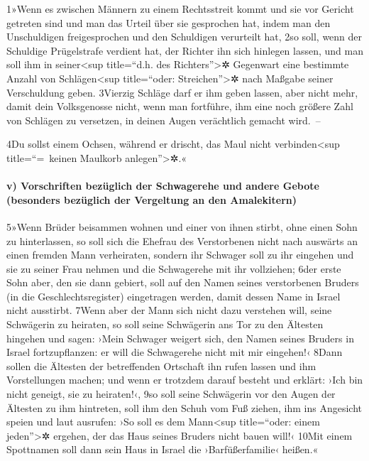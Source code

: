 1»Wenn es zwischen Männern zu einem Rechtsstreit kommt und sie vor
Gericht getreten sind und man das Urteil über sie gesprochen hat, indem
man den Unschuldigen freigesprochen und den Schuldigen verurteilt hat,
2so soll, wenn der Schuldige Prügelstrafe verdient hat, der Richter ihn
sich hinlegen lassen, und man soll ihm in seiner\textless sup
title=``d.h. des Richters''\textgreater✲ Gegenwart eine bestimmte Anzahl
von Schlägen\textless sup title=``oder: Streichen''\textgreater✲ nach
Maßgabe seiner Verschuldung geben. 3Vierzig Schläge darf er ihm geben
lassen, aber nicht mehr, damit dein Volksgenosse nicht, wenn man
fortführe, ihm eine noch größere Zahl von Schlägen zu versetzen, in
deinen Augen verächtlich gemacht wird.~--

4Du sollst einem Ochsen, während er drischt, das Maul nicht
verbinden\textless sup title=``=~keinen Maulkorb
anlegen''\textgreater✲.«

\hypertarget{v-vorschriften-bezuxfcglich-der-schwagerehe-und-andere-gebote-besonders-bezuxfcglich-der-vergeltung-an-den-amalekitern}{%
\paragraph{v) Vorschriften bezüglich der Schwagerehe und andere Gebote
(besonders bezüglich der Vergeltung an den
Amalekitern)}\label{v-vorschriften-bezuxfcglich-der-schwagerehe-und-andere-gebote-besonders-bezuxfcglich-der-vergeltung-an-den-amalekitern}}

5»Wenn Brüder beisammen wohnen und einer von ihnen stirbt, ohne einen
Sohn zu hinterlassen, so soll sich die Ehefrau des Verstorbenen nicht
nach auswärts an einen fremden Mann verheiraten, sondern ihr Schwager
soll zu ihr eingehen und sie zu seiner Frau nehmen und die Schwagerehe
mit ihr vollziehen; 6der erste Sohn aber, den sie dann gebiert, soll auf
den Namen seines verstorbenen Bruders (in die Geschlechtsregister)
eingetragen werden, damit dessen Name in Israel nicht ausstirbt. 7Wenn
aber der Mann sich nicht dazu verstehen will, seine Schwägerin zu
heiraten, so soll seine Schwägerin ans Tor zu den Ältesten hingehen und
sagen: ›Mein Schwager weigert sich, den Namen seines Bruders in Israel
fortzupflanzen: er will die Schwagerehe nicht mit mir eingehen!‹ 8Dann
sollen die Ältesten der betreffenden Ortschaft ihn rufen lassen und ihm
Vorstellungen machen; und wenn er trotzdem darauf besteht und erklärt:
›Ich bin nicht geneigt, sie zu heiraten!‹, 9so soll seine Schwägerin vor
den Augen der Ältesten zu ihm hintreten, soll ihm den Schuh vom Fuß
ziehen, ihm ins Angesicht speien und laut ausrufen: ›So soll es dem
Mann\textless sup title=``oder: einem jeden''\textgreater✲ ergehen, der
das Haus seines Bruders nicht bauen will!‹ 10Mit einem Spottnamen soll
dann sein Haus in Israel die ›Barfüßerfamilie‹ heißen.«

